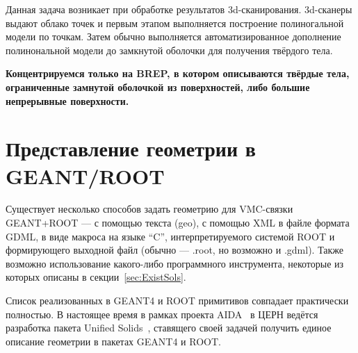 Данная задача возникает при обработке результатов 3d-сканирования. 3d-сканеры выдают облако точек и первым этапом выполняется построение полиногальной модели по точкам. Затем обычно выполняется автоматизированное дополнение полинональной модели до замкнутой оболочки для получения твёрдого тела.


\textbf{Концентрируемся только на BREP, в котором описываются твёрдые тела, ограниченные замнутой оболочкой из поверхностей, либо большие непрерывные поверхности.}



\section{Представление геометрии в GEANT/ROOT}\label{sec:secGeoROOT}

Существует несколько способов задать геометрию для VMC-связки GEANT+ROOT --- с помощью текста (geo), с помощью XML в файле формата GDML, в виде макроса на языке ``C'', интерпретируемого системой ROOT и формирующего выходной файл (обычно --- .root, но возможно и .gdml). Также возможно использование какого-либо программного инструмента, некоторые из которых описаны в секции~\ref{sec:ExistSols}.

Список реализованных в GEANT4 и ROOT примитивов совпадает практически полностью. В настоящее время в рамках проекта AIDA~\cite{AIDA} в ЦЕРН ведётся разработка пакета Unified Solids~\cite{USOLIDS}, ставящего своей задачей получить единое описание геометрии в пакетах GEANT4 и ROOT.

